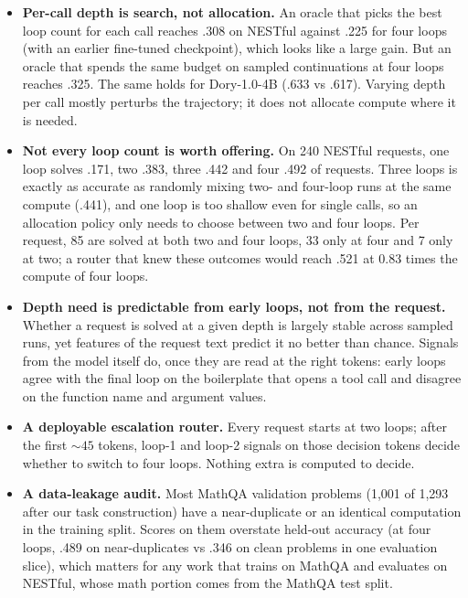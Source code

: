 \begin{itemize}
  \item \textbf{Per-call depth is search, not allocation.} An oracle that picks the best loop
  count for each call reaches .308 on NESTful against .225 for four loops (with an earlier
fine-tuned checkpoint), which looks like a
  large gain. But an oracle that spends the same budget on sampled continuations at four loops
  reaches .325. The same holds for Dory-1.0-4B (.633 vs .617). Varying depth per call mostly
  perturbs the trajectory; it does not allocate compute where it is needed.
  \item \textbf{Not every loop count is worth offering.} On 240 NESTful requests, one loop
  solves .171, two .383, three .442 and four .492 of requests. Three loops is exactly as accurate
  as randomly mixing two- and four-loop runs at the same compute (.441), and one loop is too
  shallow even for single calls, so an allocation policy only needs to choose between two and
  four loops. Per request, 85 are solved at both two and four loops, 33 only
  at four and 7 only at two; a router that knew these outcomes would reach .521 at 0.83 times the
  compute of four loops.
  \item \textbf{Depth need is predictable from early loops, not from the request.} Whether a
  request is solved at a given depth is largely stable across sampled runs, yet features of the
  request text predict it no better than chance. Signals from the model itself do, once they are
  read at the right tokens: early loops agree with the final loop on the boilerplate that opens
  a tool call and disagree on the function name and argument values.
  \item \textbf{A deployable escalation router.} Every request starts at two loops; after the
  first ${\sim}45$ tokens, loop-1 and loop-2 signals on those decision tokens decide whether to
  switch to four loops. Nothing extra is computed to decide. 
  \item \textbf{A data-leakage audit.} Most MathQA validation problems (1,001 of 1,293 after our
  task construction) have a near-duplicate or an identical computation in the training split.
  Scores on them overstate held-out accuracy (at four loops, .489 on near-duplicates vs .346 on
  clean problems in one evaluation slice), which matters for any work that trains on MathQA and evaluates on
  NESTful, whose math portion comes from the MathQA test split.
\end{itemize}
